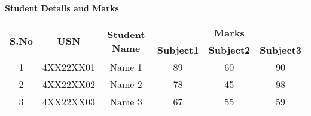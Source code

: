 \documentclass{article}
\begin{document}
	\centering
	\textbf{\Large{Student Details and Marks}} %
	\vspace{0.1in}
	
	\begin{table}[h]
		\centering
		\begin{tabular}{|c|c|c|c|c|c|} %
			\hline
			\multirow{2}{*}{\textbf{S.No}} & \multirow{2}{*}{\textbf{USN}} & \multirow{2}{*}{\textbf{Student Name}} & \multicolumn{3}{c|}{\textbf{Marks}} \\ %
			\cline{4-6} %
			& & & \textbf{Subject1} & \textbf{Subject2} & \textbf{Subject3} \\ %
			\hline
			\multicolumn{1}{|c|}{1} & \multicolumn{1}{c|}{4XX22XX01} & \multicolumn{1}{c|}{Name 1} & 89 & 60 & 90 \\ %
			\hline
			\multicolumn{1}{|c|}{2} & \multicolumn{1}{c|}{4XX22XX02} & \multicolumn{1}{c|}{Name 2} & 78 & 45 & 98 \\
			\hline
			\multicolumn{1}{|c|}{3} & \multicolumn{1}{c|}{4XX22XX03} & \multicolumn{1}{c|}{Name 3} & 67 & 55 & 59 \\
			\hline
		\end{tabular}
	\end{table}
	
\end{document}
